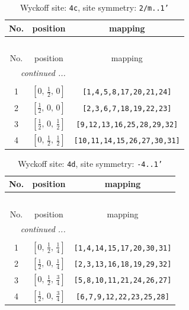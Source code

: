 \documentclass[fleqn,8pt]{jsarticle}
\begin{document}
\renewcommand{\arraystretch}{1.2}
\begin{longtable}{ccc}
\caption{Wyckoff site: {\tt 4c}, site symmetry: {\tt 2/m..1'}}
 \\
 \hline \hline
No. & position & mapping \\ \hline \endfirsthead

\multicolumn{2}{l}{\tablename\ \thetable{}} \\
 \hline \hline
No. & position & mapping \\ \hline \endhead

 \hline \hline
\multicolumn{2}{r}{\footnotesize\it continued ...} \\ \endfoot

 \hline \hline
\multicolumn{2}{r}{} \\ \endlastfoot

1 & $\left[ 0,\, \frac{1}{2},\, 0 \right]$ & {\tt [1,4,5,8,17,20,21,24]} \\ \hline
2 & $\left[ \frac{1}{2},\, 0,\, 0 \right]$ & {\tt [2,3,6,7,18,19,22,23]} \\ \hline
3 & $\left[ \frac{1}{2},\, 0,\, \frac{1}{2} \right]$ & {\tt [9,12,13,16,25,28,29,32]} \\ \hline
4 & $\left[ 0,\, \frac{1}{2},\, \frac{1}{2} \right]$ & {\tt [10,11,14,15,26,27,30,31]} \\
\end{longtable}
\renewcommand{\arraystretch}{1.2}
\begin{longtable}{ccc}
\caption{Wyckoff site: {\tt 4d}, site symmetry: {\tt -4..1'}}
 \\
 \hline \hline
No. & position & mapping \\ \hline \endfirsthead

\multicolumn{2}{l}{\tablename\ \thetable{}} \\
 \hline \hline
No. & position & mapping \\ \hline \endhead

 \hline \hline
\multicolumn{2}{r}{\footnotesize\it continued ...} \\ \endfoot

 \hline \hline
\multicolumn{2}{r}{} \\ \endlastfoot

1 & $\left[ 0,\, \frac{1}{2},\, \frac{1}{4} \right]$ & {\tt [1,4,14,15,17,20,30,31]} \\ \hline
2 & $\left[ \frac{1}{2},\, 0,\, \frac{1}{4} \right]$ & {\tt [2,3,13,16,18,19,29,32]} \\ \hline
3 & $\left[ 0,\, \frac{1}{2},\, \frac{3}{4} \right]$ & {\tt [5,8,10,11,21,24,26,27]} \\ \hline
4 & $\left[ \frac{1}{2},\, 0,\, \frac{3}{4} \right]$ & {\tt [6,7,9,12,22,23,25,28]} \\
\end{longtable}
\end{document}
